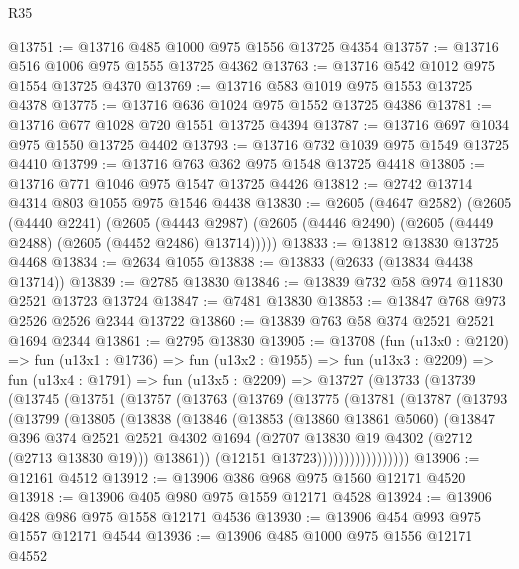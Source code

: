 \begin{lexlean}{R35}
\begin{coremodule}
@13751 := @13716 @485 @1000 @975 @1556 @13725 @4354
@13757 := @13716 @516 @1006 @975 @1555 @13725 @4362
@13763 := @13716 @542 @1012 @975 @1554 @13725 @4370
@13769 := @13716 @583 @1019 @975 @1553 @13725 @4378
@13775 := @13716 @636 @1024 @975 @1552 @13725 @4386
@13781 := @13716 @677 @1028 @720 @1551 @13725 @4394
@13787 := @13716 @697 @1034 @975 @1550 @13725 @4402
@13793 := @13716 @732 @1039 @975 @1549 @13725 @4410
@13799 := @13716 @763 @362 @975 @1548 @13725 @4418
@13805 := @13716 @771 @1046 @975 @1547 @13725 @4426
@13812 := @2742 @13714 @4314 @803 @1055 @975 @1546 @4438
@13830 := @2605
    (@4647 @2582)
    (@2605
      (@4440 @2241)
      (@2605
        (@4443 @2987)
        (@2605 (@4446 @2490) (@2605 (@4449 @2488) (@2605 (@4452 @2486) @13714)))))
@13833 := @13812 @13830 @13725 @4468
@13834 := @2634 @1055
@13838 := @13833 (@2633 (@13834 @4438 @13714))
@13839 := @2785 @13830
@13846 := @13839 @732 @58 @974 @11830 @2521 @13723 @13724
@13847 := @7481 @13830
@13853 := @13847 @768 @973 @2526 @2526 @2344 @13722
@13860 := @13839 @763 @58 @374 @2521 @2521 @1694 @2344
@13861 := @2795 @13830
@13905 := @13708
    (fun (u13x0 : @2120) =>
    fun (u13x1 : @1736) =>
    fun (u13x2 : @1955) =>
    fun (u13x3 : @2209) =>
    fun (u13x4 : @1791) =>
    fun (u13x5 : @2209) =>
    @13727
      (@13733
        (@13739
          (@13745
            (@13751
              (@13757
                (@13763
                  (@13769
                    (@13775
                      (@13781
                        (@13787
                          (@13793
                            (@13799
                              (@13805
                                (@13838
                                  (@13846
                                    (@13853
                                      (@13860 @13861 @5060)
                                      (@13847
                                        @396
                                        @374
                                        @2521
                                        @2521
                                        @4302
                                        @1694
                                        (@2707 @13830 @19 @4302 (@2712 (@2713 @13830 @19)))
                                        @13861))
                                    (@12151 @13723)))))))))))))))))
@13906 := @12161 @4512
@13912 := @13906 @386 @968 @975 @1560 @12171 @4520
@13918 := @13906 @405 @980 @975 @1559 @12171 @4528
@13924 := @13906 @428 @986 @975 @1558 @12171 @4536
@13930 := @13906 @454 @993 @975 @1557 @12171 @4544
@13936 := @13906 @485 @1000 @975 @1556 @12171 @4552

\end{coremodule}
\end{lexlean}
